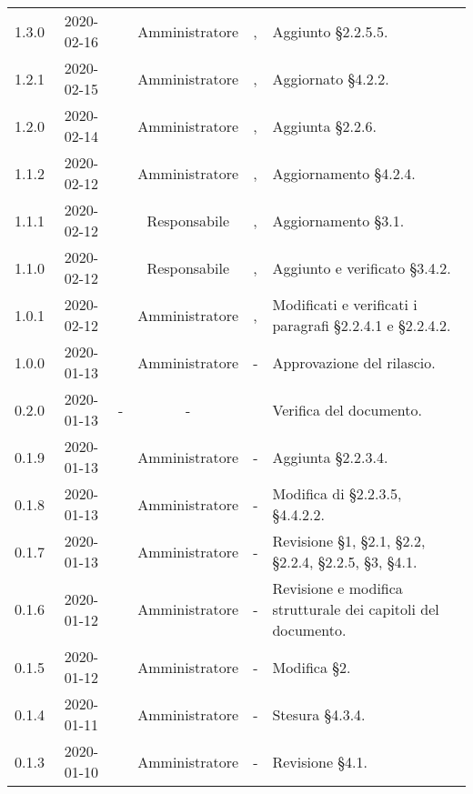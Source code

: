 {\begin{longtable}{ c c  C{2.3cm} c C{3cm} C{3.2cm}}
1.3.0 & 2020-02-16 & \SE{} & Amministratore & \CE{}, \MC{} & Aggiunto §2.2.5.5. \\

1.2.1 & 2020-02-15 & \SE{} & Amministratore & \CE{}, \MC{} & Aggiornato §4.2.2. \\

1.2.0 & 2020-02-14 & \SE{} & Amministratore & \CE{}, \MC{} & Aggiunta §2.2.6. \\

1.1.2 & 2020-02-12 & \SE{} & Amministratore & \CE{}, \MC{} & Aggiornamento §4.2.4. \\ 

1.1.1 & 2020-02-12 & \BR{} & Responsabile & \CE{}, \MC{} & Aggiornamento §3.1. \\ 

1.1.0 & 2020-02-12 & \BR{} & Responsabile & \CE{}, \MC{} & Aggiunto e verificato §3.4.2. \\

1.0.1 & 2020-02-12 & \SE{} & Amministratore & \CE{}, \MC{} & Modificati e verificati i paragrafi §2.2.4.1 e §2.2.4.2. \\ 

1.0.0 & 2020-01-13 & \AT{} & Amministratore & - & Approvazione del  rilascio.  \\

0.2.0 & 2020-01-13 & - & - & \PF{} & Verifica del documento.  \\ 

0.1.9 & 2020-01-13 & \CE{} & Amministratore & - & Aggiunta §2.2.3.4. \\

0.1.8 & 2020-01-13 & \BR{} & Amministratore & - & Modifica di §2.2.3.5, §4.4.2.2. \\

0.1.7 & 2020-01-13 & \AT{} & Amministratore & - & Revisione §1, §2.1, §2.2, §2.2.4, §2.2.5, §3, §4.1. \\

0.1.6 & 2020-01-12 & \MC{} & Amministratore & - & Revisione e modifica strutturale dei capitoli del documento. \\

0.1.5 & 2020-01-12 & \AT{} & Amministratore & - & Modifica §2. \\

0.1.4 & 2020-01-11 & \MC{} & Amministratore & - & Stesura §4.3.4. \\

0.1.3 & 2020-01-10 & \MC{} & Amministratore & - & Revisione §4.1. \\


\end{longtable}}

